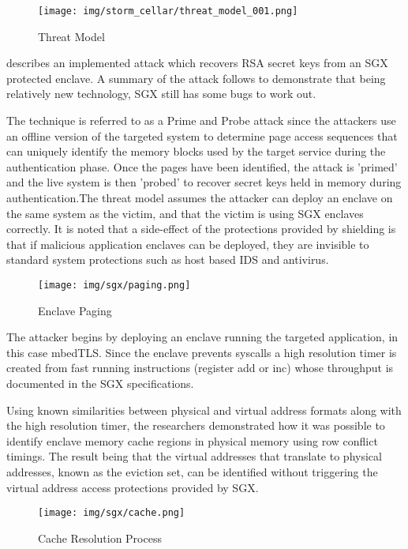 \begin{figure}[H]
\centering
\texttt{[image: img/storm\_cellar/threat\_model\_001.png]}
\caption{Threat Model}
\label{fig:threat_model}
\end{figure}


\cite{Schwarz_Weiser_Gruss_Maurice_Mangard_2017} describes an implemented attack which recovers RSA secret keys from an SGX protected enclave. A summary of the attack follows to demonstrate that being relatively new technology, SGX still has some bugs to work out. 

The technique is referred to as a Prime and Probe attack since the attackers use an offline version of the targeted system to determine page access sequences that can uniquely identify the memory blocks used by the target service during the authentication phase. Once the pages have been identified, the attack is 'primed' and the live system is then 'probed' to recover secret keys held in memory during authentication.The threat model assumes the attacker can deploy an enclave on the same system as the victim, and that the victim is using SGX enclaves correctly. It is noted that a side-effect of the protections provided by shielding is that if malicious application enclaves can be deployed, they are invisible to standard system protections such as host based IDS and antivirus. 

\begin{figure}[H]
\centering
\texttt{[image: img/sgx/paging.png]}
\caption{Enclave Paging \cite{Xu_Cui_Peinado_2015}}
\end{figure}
The attacker begins by deploying an enclave running the targeted application, in this case mbedTLS. Since the enclave prevents syscalls a high resolution timer is created from fast running instructions (register add or inc) whose throughput is documented in the SGX specifications.


 Using known similarities between physical and virtual address formats along with the high resolution timer, the researchers demonstrated how it was possible to identify enclave memory cache regions in physical memory using row conflict timings. The result being that the virtual addresses that translate to physical addresses, known as the eviction set, can be identified without triggering the virtual address access protections provided by SGX. 

\begin{figure}[H]
\centering
\texttt{[image: img/sgx/cache.png]}
\caption{Cache Resolution Process \cite{SGXinpractice}}
\end{figure}

